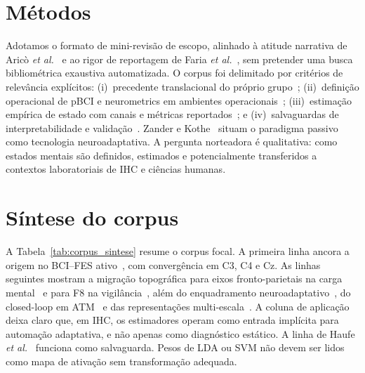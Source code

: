 \documentclass[12pt]{article}
\begin{document}
\section{M\'{e}todos}

Adotamos o formato de mini-revis\~{a}o de escopo, alinhado \`{a} atitude narrativa de Aric\`{o} \textit{et al.}~\cite{Arico2017} e ao rigor de reportagem de Faria \textit{et al.}~\cite{Faria2026}, sem pretender uma busca bibliom\'{e}trica exaustiva automatizada. O corpus foi delimitado por crit\'{e}rios de relev\^{a}ncia expl\'{i}citos: (i)~precedente translacional do pr\'{o}prio grupo~\cite{Faria2026}; (ii)~defini\c{c}\~{a}o operacional de pBCI e neurometrics em ambientes operacionais~\cite{Arico2017,Arico2016ATM}; (iii)~estima\c{c}\~{a}o emp\'{i}rica de estado com canais e m\'{e}tricas reportados~\cite{Arif2023,Rutkowski2023,Ko2021}; e (iv)~salvaguardas de interpretabilidade e valida\c{c}\~{a}o~\cite{Haufe2014,Blankertz2011,Lotte2018,Varoquaux2017}. Zander e Kothe~\cite{Zander2016} situam o paradigma passivo como tecnologia neuroadaptativa. A pergunta norteadora \'{e} qualitativa: como estados mentais s\~{a}o definidos, estimados e potencialmente transferidos a contextos laboratoriais de IHC e ci\^{e}ncias humanas.

\section{S\'{i}ntese do corpus}

A Tabela~\ref{tab:corpus_sintese} resume o corpus focal. A primeira linha ancora a origem no BCI--FES ativo~\cite{Faria2026}, com converg\^{e}ncia em C3, C4 e Cz. As linhas seguintes mostram a migra\c{c}\~{a}o topogr\'{a}fica para eixos fronto-parietais na carga mental~\cite{Arico2017} e para F8 na vigil\^{a}ncia~\cite{Arif2023}, al\'{e}m do enquadramento neuroadaptativo~\cite{Zander2016}, do closed-loop em ATM~\cite{Arico2016ATM} e das representa\c{c}\~{o}es multi-escala~\cite{Ko2021}. A coluna de aplica\c{c}\~{a}o deixa claro que, em IHC, os estimadores operam como entrada impl\'{i}cita para automa\c{c}\~{a}o adaptativa, e n\~{a}o apenas como diagn\'{o}stico est\'{a}tico. A linha de Haufe \textit{et al.}~\cite{Haufe2014} funciona como salvaguarda. Pesos de LDA ou SVM n\~{a}o devem ser lidos como mapa de ativa\c{c}\~{a}o sem transforma\c{c}\~{a}o adequada.
\end{document}

